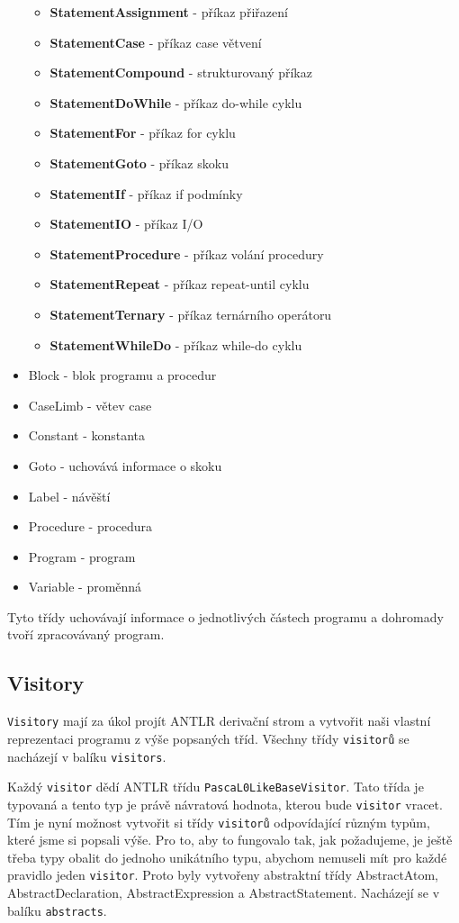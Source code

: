 \documentclass[
12pt,
a4paper,
pdftex,
czech,
titlepage
]{report}
\begin{document}
\begin{itemize}
	 \begin{itemize}
	 \item \textbf{StatementAssignment} - příkaz přiřazení
	 \item \textbf{StatementCase} - příkaz case větvení
	 \item \textbf{StatementCompound} - strukturovaný příkaz
	 \item \textbf{StatementDoWhile} - příkaz do-while cyklu
	 \item \textbf{StatementFor} - příkaz for cyklu
	 \item \textbf{StatementGoto} - příkaz skoku
	 \item \textbf{StatementIf} - příkaz if podmínky
	 \item \textbf{StatementIO} - příkaz I/O
	 \item \textbf{StatementProcedure} - příkaz volání procedury
	 \item \textbf{StatementRepeat} - příkaz repeat-until cyklu
	 \item \textbf{StatementTernary} - příkaz ternárního operátoru
	 \item \textbf{StatementWhileDo} - příkaz while-do cyklu
	 \end{itemize}
\item Block - blok programu a procedur
\item CaseLimb - větev case
\item Constant - konstanta
\item Goto - uchovává informace o skoku
\item Label - návěští
\item Procedure - procedura
\item Program - program
\item Variable - proměnná	 
 \end{itemize}
 
	 Tyto třídy uchovávají informace o jednotlivých částech programu a dohromady tvoří zpracovávaný program.
 
 \subsection{Visitory}

	\texttt{Visitory} mají za úkol projít ANTLR derivační strom a vytvořit naši vlastní reprezentaci programu z výše popsaných tříd. Všechny třídy \texttt{visitorů} se nacházejí v balíku \texttt{visitors}.
	
	 Každý \texttt{visitor} dědí ANTLR třídu \texttt{PascaL0LikeBaseVisitor}. Tato třída je typovaná a tento typ je právě návratová hodnota, kterou bude \texttt{visitor} vracet. Tím je nyní možnost vytvořit si třídy \texttt{visitorů} odpovídající různým typům, které jsme si popsali výše. Pro to, aby to fungovalo tak, jak požadujeme, je ještě třeba typy obalit do jednoho unikátního typu, abychom nemuseli mít pro každé pravidlo jeden \texttt{visitor}. Proto byly vytvořeny abstraktní třídy AbstractAtom, AbstractDeclaration, AbstractExpression a AbstractStatement. Nacházejí se v balíku \texttt{abstracts}. 
	 
\end{document}
